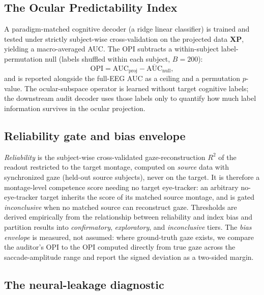 \documentclass[conference]{IEEEtran}
\begin{document}
\subsection{The Ocular Predictability Index}

A paradigm-matched cognitive decoder (a ridge linear classifier) is trained and tested under
strictly subject-wise cross-validation on the projected data $\mathbf{X}\mathbf{P}$, yielding a
macro-averaged AUC. The OPI subtracts a within-subject label-permutation null (labels shuffled
within each subject, $B=200$):
\begin{equation}
\mathrm{OPI}=\mathrm{AUC}_{\mathrm{proj}}-\overline{\mathrm{AUC}}_{\mathrm{null}},
\end{equation}
and is reported alongside the full-EEG AUC as a ceiling and a permutation $p$-value. The
ocular-subspace operator is learned without target cognitive labels; the downstream audit
decoder uses those labels only to quantify how much label information survives in the ocular
projection.

\subsection{Reliability gate and bias envelope}

\emph{Reliability} is the subject-wise cross-validated gaze-reconstruction $R^2$ of the readout
restricted to the target montage, computed on \emph{source} data with synchronized gaze
(held-out source subjects), never on the target. It is therefore a montage-level competence
score needing no target eye-tracker: an arbitrary no-eye-tracker target inherits the score of
its matched source montage, and is gated \emph{inconclusive} when no matched source can
reconstruct gaze. Thresholds are derived
empirically from the relationship between reliability and index bias and partition results into
\emph{confirmatory}, \emph{exploratory}, and \emph{inconclusive} tiers. The \emph{bias envelope}
is measured, not assumed: where ground-truth gaze exists, we compare the auditor's OPI to the
OPI computed directly from true gaze across the saccade-amplitude range and report the signed
deviation as a two-sided margin.

\subsection{The neural-leakage diagnostic}
\end{document}
